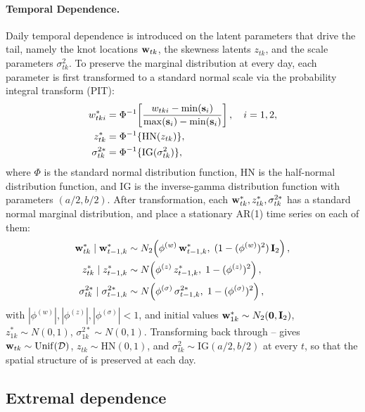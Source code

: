 \documentclass[12pt]{article}
\begin{document}
\paragraph{Temporal Dependence.}
Daily temporal dependence is introduced on the latent parameters that drive the tail, namely the knot locations $\mbox{\bf w}_{tk}$, the skewness latents $z_{tk}$, and the scale parameters $\sigma^2_{tk}$.  To preserve the marginal \skewt distribution at every day, each parameter is first transformed to a standard normal scale via the probability integral transform (PIT):
\begin{align}
  w^*_{tki} &= \Phi^{-1}\!\left[\frac{w_{tki} - \min(\mbox{\bf s}_i)}{\max(\mbox{\bf s}_i) - \min(\mbox{\bf s}_i)}\right], \quad i = 1, 2, \label{eq:wstar}\\
  z^*_{tk}  &= \Phi^{-1}\{\mathrm{HN}(z_{tk})\}, \label{eq:zstar}\\
  \sigma^{2*}_{tk} &= \Phi^{-1}\{\mathrm{IG}(\sigma^2_{tk})\}, \label{eq:sigmastar}
\end{align}
where $\Phi$ is the standard normal distribution function, $\mathrm{HN}$ is the half-normal distribution function, and $\mathrm{IG}$ is the inverse-gamma distribution function with parameters $(a/2, b/2)$.  After transformation, each $\mbox{\bf w}^*_{tk}, z^*_{tk}, \sigma^{2*}_{tk}$ has a standard normal marginal distribution, and \textcite{morris_space-time_2017} place a stationary AR(1) time series on each of them:
\begin{align}
  \mbox{\bf w}^*_{tk} \mid \mbox{\bf w}^*_{t-1, k} &\sim N_2\!\left(\phi^{(w)}\, \mbox{\bf w}^*_{t-1, k},\; (1 - (\phi^{(w)})^2)\, \mbox{\bf I}_2\right), \label{eq:ar1-w}\\
  z^*_{tk} \mid z^*_{t-1, k} &\sim N\!\left(\phi^{(z)}\, z^*_{t-1, k},\; 1 - (\phi^{(z)})^2\right), \label{eq:ar1-z}\\
  \sigma^{2*}_{tk} \mid \sigma^{2*}_{t-1, k} &\sim N\!\left(\phi^{(\sigma)}\, \sigma^{2*}_{t-1, k},\; 1 - (\phi^{(\sigma)})^2\right), \label{eq:ar1-sigma}
\end{align}
with $|\phi^{(w)}|, |\phi^{(z)}|, |\phi^{(\sigma)}| < 1$, and initial values $\mbox{\bf w}^*_{1k} \sim N_2(\mbox{\boldmath $0$}, \mbox{\bf I}_2)$, $z^*_{1k} \sim N(0, 1)$, $\sigma^{2*}_{1k} \sim N(0, 1)$.  Transforming back through -- gives $\mbox{\bf w}_{tk} \sim \mathrm{Unif}({\cal D})$, $z_{tk} \sim \mathrm{HN}(0, 1)$, and $\sigma^2_{tk} \sim \mathrm{IG}(a/2, b/2)$ at every $t$, so that the spatial \skewt structure of  is preserved at each day.

\subsection{Extremal dependence}\label{sec:extdep}
\end{document}
